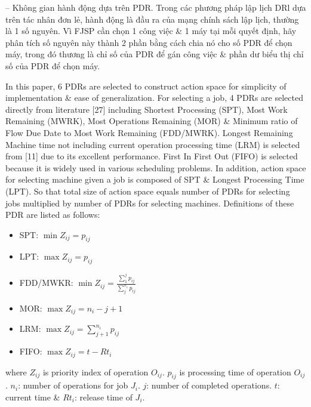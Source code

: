 \documentclass{article}
\begin{document}
\begin{itemize}
\begin{itemize}
        -- {\sf Không gian hành động dựa trên PDR.} Trong các phương pháp lập lịch DRl dựa trên tác nhân đơn lẻ, hành động là đầu ra của mạng chính sách lập lịch, thường là 1 số nguyên. Vì FJSP cần chọn 1 công việc \& 1 máy tại mỗi quyết định, hãy phân tích số nguyên này thành 2 phần bằng cách chia nó cho số PDR để chọn máy, trong đó thương là chỉ số của PDR để gán công việc \& phần dư biểu thị chỉ số của PDR để chọn máy.

        In this paper, 6 PDRs are selected to construct action space for simplicity of implementation \& ease of generalization. For selecting a job, 4 PDRs are selected directly from literature [27] including Shortest Processing (SPT), Most Work Remaining (MWRK), Most Operations Remaining (MOR) \& Minimum ratio of Flow Due Date to Most Work Remaining (FDD/MWRK). Longest Remaining Machine time not including current operation processing time (LRM) is selected from [11] due to its excellent performance. First In First Out (FIFO) is selected because it is widely used in various scheduling problems. In addition, action space for selecting machine given a job is composed of SPT \& Longest Processing Time (LPT). So that total size of action space equals number of PDRs for selecting jobs multiplied by number of PDRs for selecting machines. Definitions of these PDR are listed as follows:
        \begin{itemize}
            \item SPT: $\min Z_{ij} = p_{ij}$
            \item LPT: $\max Z_{ij} = p_{ij}$
            \item FDD/MWKR: $\min Z_{ij} = \frac{\sum_1^j p_{ij}}{\sum_j^{n_i} p_{ij}}$
            \item MOR: $\max Z_{ij} = n_i - j + 1$
            \item LRM: $\max Z_{ij} = \sum_{j+1}^{n_i} p_{ij}$
            \item FIFO: $\max Z_{ij} = t - Rt_i$
        \end{itemize}
        where $Z_{ij}$ is priority index of operation $O_{ij}$. $p_{ij}$ is processing time of operation $O_{ij}$. $n_i$: number of operations for job $J_i$. $j$: number of completed operations. $t$: current time \& $Rt_i$: release time of $J_i$.


\end{itemize}
\end{itemize}
\end{document}
